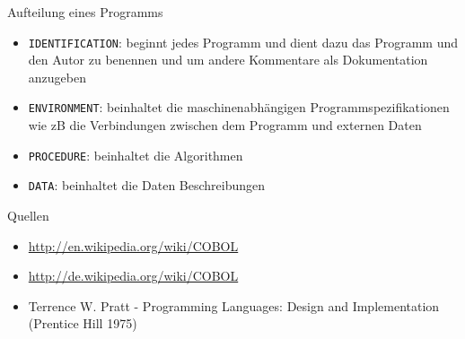 \documentclass{beamer}
\begin{document}
\begin{frame}{Aufteilung eines Programms}
	\begin{itemize}
		\item
			\texttt{IDENTIFICATION}: beginnt jedes Programm und dient dazu das Programm und den Autor zu benennen und um andere Kommentare als Dokumentation anzugeben
		\item
			\texttt{ENVIRONMENT}: beinhaltet die maschinenabhängigen Programmspezifikationen wie zB die Verbindungen zwischen dem Programm und externen Daten
		\item
			\texttt{PROCEDURE}: beinhaltet die Algorithmen
		\item
			\texttt{DATA}: beinhaltet die Daten Beschreibungen
	\end{itemize}
\end{frame}

\begin{frame}{Quellen}
	\begin{itemize}
		\item
			\url{http://en.wikipedia.org/wiki/COBOL}
		\item
			\url{http://de.wikipedia.org/wiki/COBOL}
		\item
			Terrence W. Pratt - Programming Languages: Design and Implementation (Prentice Hill 1975)
	\end{itemize}
\end{frame}
\end{document}
